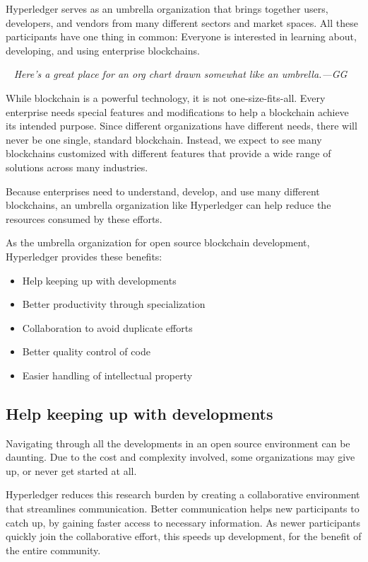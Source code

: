 Hyperledger serves as an umbrella organization that brings together users, developers, and vendors from many different sectors and market spaces. 
All these participants have one thing in common: Everyone is interested in learning about, developing, and using enterprise blockchains. 

~\newline
\emph{Here's a great place for an org chart drawn somewhat like an umbrella.---GG}
~\newline

While blockchain is a powerful technology, it is not one-size-fits-all. 
Every enterprise needs special features and modifications to help a blockchain achieve its intended purpose.
Since different organizations have different needs, there will never be one single, standard blockchain. 
Instead, we expect to see many blockchains customized with different features that provide a wide range of solutions across many industries.

Because enterprises need to understand, develop, and use many different blockchains, an umbrella organization like Hyperledger can help reduce the resources consumed by these efforts.

As the umbrella organization for open source blockchain development, Hyperledger provides these benefits: 
\begin{itemize}
\item Help keeping up with developments
\item Better productivity through specialization
\item Collaboration to avoid duplicate efforts
\item Better quality control of code
\item Easier handling of intellectual property
\end{itemize}

\subsection{Help keeping up with developments}
Navigating through all the developments in an open source environment can be daunting. 
Due to the cost and complexity involved, some organizations may give up, or never get started at all. 

Hyperledger reduces this research burden by creating a collaborative environment that streamlines communication. 
Better communication helps new participants to catch up, by gaining faster access to necessary information.
As newer participants quickly join the collaborative effort, this speeds up development, for the benefit of the entire community. 

